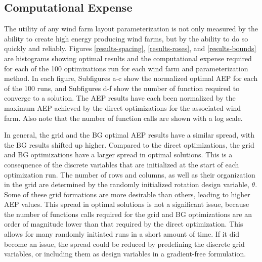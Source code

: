 \documentclass[wes, manuscript]{copernicus}
\begin{document}
\subsection{Computational Expense}
The utility of any wind farm layout parameterization is not only measured by the ability to create high energy producing wind farms, but by the ability to do so quickly and reliably. Figures \ref{results-spacing}, \ref{results-roses}, and \ref{results-bounds} are histograms showing optimal results and the computational expense required for each of the 100 optimizations run for each wind farm and parameterization method. In each figure, Subfigures a-c show the normalized optimal AEP for each of the 100 runs, and Subfigures d-f show the number of function required to converge to a solution. The AEP results have each been normalized by the maximum AEP achieved by the direct optimizations for the associated wind farm. Also note that the number of function calls are shown with a log scale.

In general, the grid and the BG optimal AEP results have a similar spread, with the BG results shifted up higher. Compared to the direct optimizations, the grid and BG optimizations have a larger spread in optimal solutions. This is a consequence of the discrete variables that are initialized at the start of each optimization run. The number of rows and columns, as well as their organization in the grid are determined by the randomly initialized rotation design variable, $\theta$. Some of these grid formations are more desirable than others, leading to higher AEP values. This spread in optimal solutions is not a significant issue, because the number of functions calls required for the grid and BG optimizations are an order of magnitude lower than that required by the direct optimization. This allows for many randomly initiated runs in a short amount of time. If it did become an issue, the spread could be reduced by predefining the discrete grid variables, or including them as design variables in a gradient-free formulation.
\end{document}
